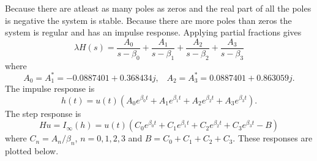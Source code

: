 \begin{excersizelist}
\begin{solution}
\begin{center}
\end{center}

Because there are atleast as many poles as zeros and the real part of all the poles is negative the system is stable.  Because there are more poles than zeros the system is regular and has an impulse response.  Applying partial fractions gives
\[
\lambda H(s) = \frac{A_0}{s - \beta_0} + \frac{A_1}{s - \beta_1} + \frac{A_2}{s - \beta_2} + \frac{A_3}{s - \beta_3}
\]
where
\[
A_0 = A_1^* = -0.0887401 + 0.368434 j, \;\;\; A_2 = A_3^* = 0.0887401 + 0.863059j.
\]
The impulse response is
\[
h(t) = u(t) \left( A_0 e^{\beta_0 t} + A_1 e^{\beta_1 t} + A_2 e^{\beta_2 t} + A_3 e^{\beta_3 t}  \right).
\]
The step response is
\[
H u = I_\infty(h) = u(t) \left( C_0 e^{ \beta_0 t} + C_1 e^{\beta_1 t} + C_2 e^{\beta_2 t} + C_3 e^{\beta_3 t} - B  \right)
\]
where $C_n = A_n/\beta_n$, $n = 0,1,2,3$ and $B=C_0+C_1+C_2+C_3$.  These responses are plotted below.

\begin{center} 
  {
    \def\Azeroabs{0.37897}
    \def\Azeroarg{-1.80715}
    \def\Atwoabs{0.867609}
    \def\Atwoarg{-1.46834}
    \def\betazerore{-0.193622}
    \def\betazeroim{-1.17046}
    \def\betatwore{-0.306378}
    \def\betatwoim{0.511255}
    \def\Czeroabs{0.319438}
    \def\Czeroarg{-0.0724163}
    \def\Ctwoabs{1.45565}
    \def\Ctwoarg{2.70417}
    \def\B{-2}
    \def\step(#1){ifthenelse(#1>0,1,0)}
    \def\h(#1){2*\step(#1)*(\Azeroabs*exp(\betazerore*#1)*cos(180/3.145*(\betazeroim*#1 + \Azeroarg)) + \Atwoabs*exp(\betatwore*#1)*cos(180/3.145*(\betatwoim*#1 + \Atwoarg)))}
    \def\Hu(#1){\step(#1)*(2*\Czeroabs*exp(\betazerore*#1)*cos(180/3.145*(\betazeroim*#1 + \Czeroarg)) + 2*\Ctwoabs*exp(\betatwore*#1)*cos(180/3.145*(\betatwoim*#1 + \Ctwoarg)) - \B)}

}
\end{center}
\end{solution}
\end{excersizelist}
